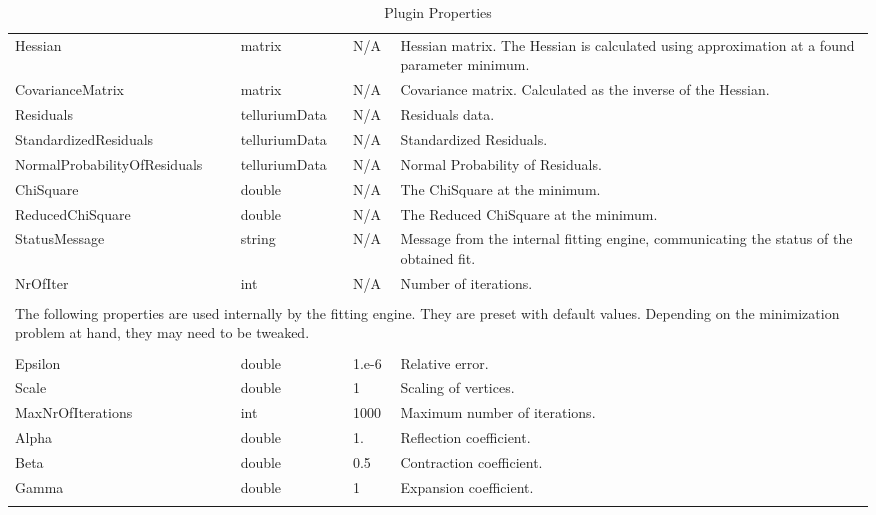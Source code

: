 \begin{landscape}
\begin{longtable}{p{4cm} l p{3cm}  p{10cm}}
Hessian							&	matrix				& N/A    &   Hessian matrix. The Hessian is calculated using approximation at a found parameter minimum. \\
CovarianceMatrix				&	matrix				& N/A    &   Covariance matrix. Calculated as the inverse of the Hessian.\\
Residuals     					& 	telluriumData    	& N/A    &   Residuals data.  \\
StandardizedResiduals			&	telluriumData		& N/A    &   Standardized Residuals.\\
NormalProb\-abilityOfResiduals	&	telluriumData		& N/A    &   Normal Probability of Residuals.\\
ChiSquare						&	double				& N/A    &   The ChiSquare at the minimum.\\
ReducedChiSquare				&	double				& N/A    &   The Reduced ChiSquare at the minimum.\\
StatusMessage					&	string				& N/A    &   Message from the internal fitting engine, communicating the status of the obtained fit.\\
NrOfIter                        &   int                 & N/A    &   Number of iterations. \\[12pt]
\\[2pt]                                                               
\multicolumn{4}{p{19cm}}{The following properties are used internally by the fitting engine. They are preset with default values. Depending on the minimization problem at hand, they may need to be tweaked. } \\[12pt]
\hline %
\\[2pt]                                                               
Epsilon                         &   double              & 1.e-6          		&   Relative error. \\
Scale                           &   double              & 1			            &   Scaling of vertices. \\
MaxNrOfIterations               &   int		            & 1000          		&   Maximum number of iterations. \\
Alpha                         	&   double              & 1.          			&   Reflection coefficient. \\
Beta                       		&   double              & 0.5                 	&   Contraction coefficient. \\
Gamma                        	&   double              & 1                   	&   Expansion coefficient. \\
                                                        
\hline %
\caption{Plugin Properties} 
\label{table:nmPluginProperties} 
\end{longtable}

\end{landscape}

